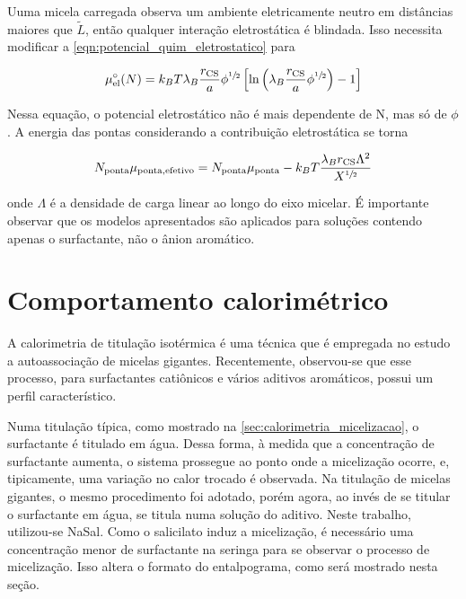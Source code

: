 		Uuma micela carregada observa um ambiente eletricamente neutro em distâncias maiores que \(\tilde{L}\), então qualquer interação eletrostática é blindada. Isso necessita modificar a \autoref{eqn:potencial_quim_eletrostatico} para \cite{Giant_Micelles}
		
		\begin{equation}
			\mu_\mathrm{el}^\circ(N) = k_B T \lambda_B \dfrac{r_\mathrm{CS}}{a} \phi^{\sfrac{1}{2}} \left[ \ln \left( \lambda_B \dfrac{r_\mathrm{CS}}{a} \phi^{\sfrac{1}{2}} \right) - 1 \right]
			\label{eqn:potencial_eletrostatico_semidiluido}
		\end{equation}
		
		Nessa equação, o potencial eletrostático não é mais dependente de N, mas só de \(\phi\). A energia das pontas considerando a contribuição eletrostática se torna \cite{Giant_Micelles}
		
		\begin{equation}
			N_\mathrm{ponta}\mu_\mathrm{ponta, efetivo} = N_\mathrm{ponta}\mu_\mathrm{ponta} - k_B T \dfrac{\lambda_B r_\mathrm{CS} \Lambda^2}{X^{\sfrac{1}{2}}}
		\end{equation} 
		
		\noindent onde \(\Lambda\) é a densidade de carga linear ao longo do eixo micelar. É importante observar que os modelos apresentados são aplicados para soluções contendo apenas o surfactante, não o ânion aromático.
		

		\section{Comportamento calorimétrico} 
		
		A calorimetria de titulação isotérmica é uma técnica que é empregada no estudo a autoassociação de micelas gigantes.\cite{Sarac2009, Sarac2013, Liu2011a, Bijma1998c, Fisicaro2005a} Recentemente, observou-se que esse processo, para surfactantes catiônicos e vários aditivos aromáticos, possui um perfil característico.\cite{Ito2016, Ito2015c}

		Numa titulação típica, como mostrado na \autoref{sec:calorimetria_micelizacao}, o surfactante é titulado em água. Dessa forma, à medida que a concentração de surfactante aumenta, o sistema prossegue ao ponto onde a micelização ocorre, e, tipicamente, uma variação no calor trocado é observada. Na titulação de micelas gigantes, o mesmo procedimento foi adotado, porém agora, ao invés de se titular o surfactante em água, se titula numa solução do aditivo. Neste trabalho, utilizou-se NaSal. Como o salicilato induz a micelização, é necessário uma concentração menor de surfactante na seringa para se observar o processo de micelização. Isso altera o formato do entalpograma, como será mostrado nesta seção.
		
